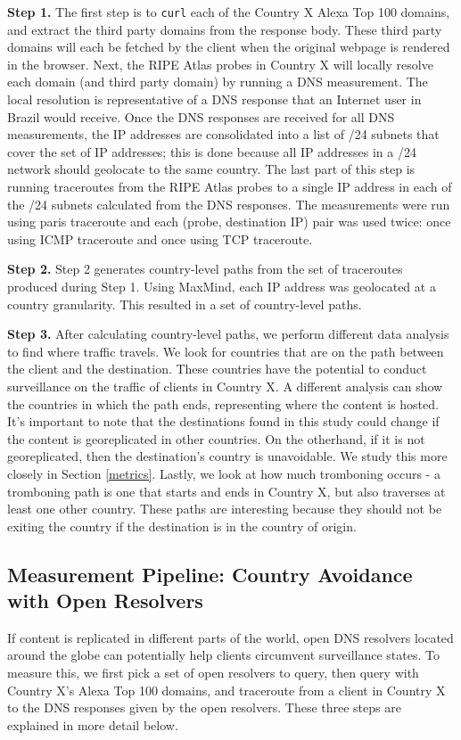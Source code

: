 {\bf Step 1.} The first step is to {\tt curl} each of the Country X Alexa Top 100 domains, and extract the third party domains from the response body.  These third party domains will each be fetched by the client when the original webpage is rendered in the browser.  Next, the RIPE Atlas probes in Country X will locally resolve each domain (and third party domain) by running a DNS measurement.  The local resolution is representative of a DNS response that an Internet user in Brazil would receive.  Once the DNS responses are received for all DNS measurements, the IP addresses are consolidated into a list of /24 subnets that cover the set of IP addresses; this is done because all IP addresses in a /24 network should geolocate to the same country.  The last part of this step is running traceroutes from the RIPE Atlas probes to a single IP address in each of the /24 subnets calculated from the DNS responses.  The measurements were run using paris traceroute and each (probe, destination IP) pair was used twice: once using ICMP traceroute and once using TCP traceroute.  

{\bf Step 2.}  Step 2 generates country-level paths from the set of traceroutes produced during Step 1.  Using MaxMind, each IP address was geolocated at a country granularity.  This resulted in a set of country-level paths.

{\bf Step 3.}  After calculating country-level paths, we perform different data analysis to find where traffic travels.  We look for countries that are on the path between the client and the destination.  These countries have the potential to conduct surveillance on the traffic of clients in Country X.  A different analysis can show the countries in which the path ends, representing where the content is hosted.  It's important to note that the destinations found in this study could change if the content is georeplicated in other countries.  On the otherhand, if it is not georeplicated, then the destination's country is unavoidable.  We study this more closely in Section \ref{metrics}.  Lastly, we look at how much tromboning occurs - a tromboning path is one that starts and ends in Country X, but also traverses at least one other country.  These paths are interesting because they should not be exiting the country if the destination is in the country of origin.  

\subsection{Measurement Pipeline: Country Avoidance with Open Resolvers}
\label{pipeline2}
If content is replicated in different parts of the world, open DNS resolvers located around the globe can potentially help clients circumvent surveillance states.  To measure this, we first pick a set of open resolvers to query, then query with Country X's Alexa Top 100 domains, and traceroute from a client in Country X to the DNS responses given by the open resolvers.  These three steps are explained in more detail below.

